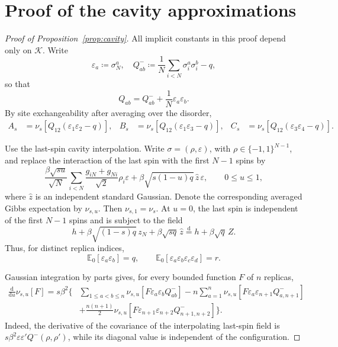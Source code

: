 \documentclass[11pt]{article}
\numberwithin{equation}{section}
\newcommand{\1}{\mathbf 1}
\newcommand{\cK}{\mathcal K}
\begin{document}
\appendix
\section{Proof of the cavity approximations}
\label{app:cavity-identities}

\begin{proof}[Proof of Proposition~\ref{prop:cavity}]
 All implicit constants in this proof depend only on $\cK$.  Write
\[
\varepsilon_a\coloneqq\sigma_N^a,
 \quad
 Q^-_{ab}\coloneqq\frac1N\sum_{i<N}\sigma_i^a\sigma_i^b-q,
\]
so that
\begin{equation}
 Q_{ab}=Q^-_{ab}+\frac1N\varepsilon_a\varepsilon_b.
 \label{eq:Qab}
\end{equation}
By site exchangeability after averaging over the disorder,
\begin{align*}
 A_s&=\nu_s\!\left[Q_{12}(\varepsilon_1\varepsilon_2-q)\right],&
 B_s&=\nu_s\!\left[Q_{12}(\varepsilon_1\varepsilon_3-q)\right],&
 C_s&=\nu_s\!\left[Q_{12}(\varepsilon_3\varepsilon_4-q)\right].
\end{align*}

Use the last-spin cavity interpolation.  Write
$\sigma=(\rho,\varepsilon)$, with $\rho\in\{-1,1\}^{N-1}$, and replace
the interaction of the last spin with the first $N-1$ spins by
\[
 \frac{\beta\sqrt{su}}{\sqrt N}
 \sum_{i<N}\frac{g_{iN}+g_{Ni}}{\sqrt2}\rho_i\varepsilon
 +\beta\sqrt{s(1-u)q}\,\widehat z\,\varepsilon,
 \qquad 0\le u\le1,
\]
where $\widehat z$ is an independent standard Gaussian.  Denote the
corresponding averaged Gibbs expectation by $\nu_{s,u}$.  Then
$\nu_{s,1}=\nu_s$.  At $u=0$, the last spin is independent of the first
$N-1$ spins and is subject to the field
\[
 h+\beta\sqrt{(1-s)q}\,z_N+\beta\sqrt{sq}\,\widehat z
 \stackrel{\mathrm d}=h+\beta\sqrt q\,Z.
\]
Thus, for distinct replica indices,
\begin{equation}
 \mathbb E_0[\varepsilon_a\varepsilon_b]=q,
 \qquad
 \mathbb E_0[\varepsilon_a\varepsilon_b\varepsilon_c\varepsilon_d]=r.
 \label{eq:last-spin-moments-proof}
\end{equation}

Gaussian integration by parts gives, for every bounded function $F$ of
$n$ replicas,
\begin{align}
 \frac{\mathrm d}{\mathrm du}\nu_{s,u}[F]
 =s\beta^2\Bigg\{&
 \sum_{1\le a<b\le n}
 \nu_{s,u}[F\varepsilon_a\varepsilon_bQ^-_{ab}]
 -n\sum_{a=1}^n
 \nu_{s,u}[F\varepsilon_a\varepsilon_{n+1}Q^-_{a,n+1}]
 \nonumber\\
 &+\frac{n(n+1)}2
 \nu_{s,u}[F\varepsilon_{n+1}\varepsilon_{n+2}
 Q^-_{n+1,n+2}]
 \Bigg\}.
 \label{eq:cavity-derivative-proof}
\end{align}
Indeed, the derivative of the covariance of the interpolating
last-spin field is
$s\beta^2\varepsilon\varepsilon'Q^-(\rho,\rho')$, while its diagonal
value is independent of the configuration.


\end{proof}
\end{document}
